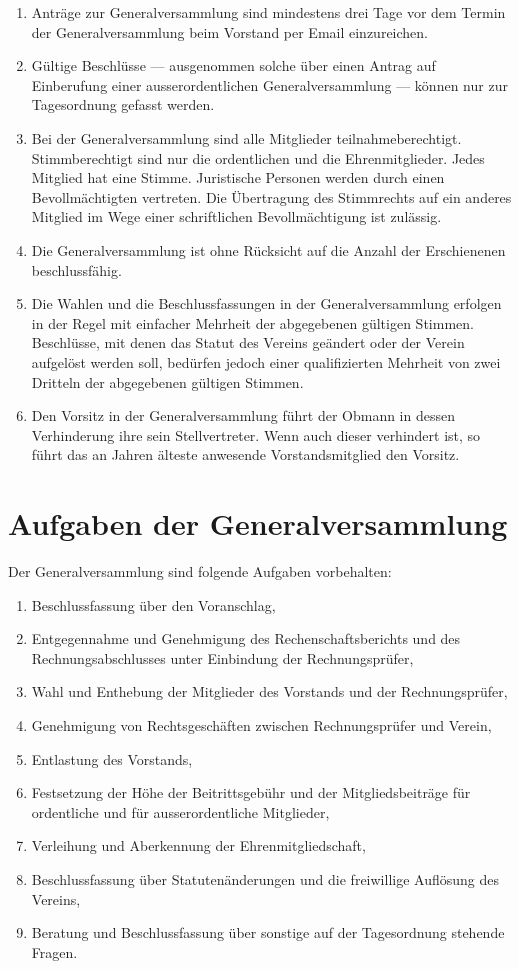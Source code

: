 \documentclass[a4paper,12pt]{article}
\begin{document}
\begin{enumerate}
			\item Anträge zur Generalversammlung sind mindestens drei Tage vor dem Termin der Generalversammlung beim Vorstand per Email einzureichen.
			\item Gültige Beschlüsse --- ausgenommen solche über einen Antrag auf Einberufung einer ausserordentlichen Generalversammlung --- können nur zur Tagesordnung gefasst werden.
			\item Bei der Generalversammlung sind alle Mitglieder teilnahmeberechtigt. Stimmberechtigt sind nur die ordentlichen und die Ehrenmitglieder. Jedes Mitglied hat eine Stimme. Juristische Personen werden durch einen Bevollmächtigten vertreten. Die Übertragung des Stimmrechts auf ein anderes Mitglied im Wege einer schriftlichen Bevollmächtigung ist zulässig.
			\item Die Generalversammlung ist ohne Rücksicht auf die Anzahl der Erschienenen beschlussfähig.
			\item Die Wahlen und die Beschlussfassungen in der Generalversammlung erfolgen in der Regel mit einfacher Mehrheit der abgegebenen gültigen Stimmen. Beschlüsse, mit denen das Statut des Vereins geändert oder der Verein aufgelöst werden soll, bedürfen jedoch einer qualifizierten Mehrheit von zwei Dritteln der abgegebenen gültigen Stimmen.
			\item Den Vorsitz in der Generalversammlung führt der Obmann in dessen Verhinderung ihre sein Stellvertreter. Wenn auch dieser verhindert ist, so führt das an Jahren älteste anwesende Vorstandsmitglied den Vorsitz.
		\end{enumerate}

	\section{Aufgaben der Generalversammlung}
		\label{sec:aufgaben-generalversammlung}
		Der Generalversammlung sind folgende Aufgaben vorbehalten:
		\begin{enumerate}
			\item Beschlussfassung über den Voranschlag,
			\item Entgegennahme und Genehmigung des Rechenschaftsberichts und des Rechnungsabschlusses unter Einbindung der Rechnungsprüfer,
			\item Wahl und Enthebung der Mitglieder des Vorstands und der Rechnungsprüfer,
			\item Genehmigung von Rechtsgeschäften zwischen Rechnungsprüfer und Verein,
			\item Entlastung des Vorstands,
			\item Festsetzung der Höhe der Beitrittsgebühr und der Mitgliedsbeiträge für ordentliche und für ausserordentliche Mitglieder,
			\item Verleihung und Aberkennung der Ehrenmitgliedschaft,
			\item Beschlussfassung über Statutenänderungen und die freiwillige Auflösung des Vereins,
			\item Beratung und Beschlussfassung über sonstige auf der Tagesordnung stehende Fragen.
		\end{enumerate}
\end{document}
